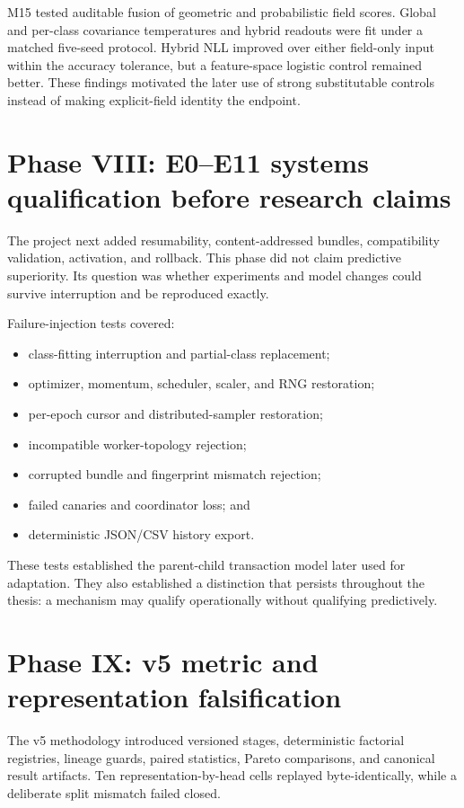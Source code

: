 \documentclass[12pt,oneside]{report}
\begin{document}
M15 tested auditable fusion of geometric and probabilistic field scores.
Global and per-class covariance temperatures and hybrid readouts were fit under
a matched five-seed protocol. Hybrid NLL improved over either field-only input
within the accuracy tolerance, but a feature-space logistic control remained
better. These findings motivated the later use of strong substitutable controls
instead of making explicit-field identity the endpoint.

\section{Phase VIII: E0--E11 systems qualification before research claims}

The project next added resumability, content-addressed bundles, compatibility
validation, activation, and rollback. This phase did not claim predictive
superiority. Its question was whether experiments and model changes could
survive interruption and be reproduced exactly.

Failure-injection tests covered:

\begin{itemize}
\item class-fitting interruption and partial-class replacement;
\item optimizer, momentum, scheduler, scaler, and RNG restoration;
\item per-epoch cursor and distributed-sampler restoration;
\item incompatible worker-topology rejection;
\item corrupted bundle and fingerprint mismatch rejection;
\item failed canaries and coordinator loss; and
\item deterministic JSON/CSV history export.
\end{itemize}

These tests established the parent-child transaction model later used for
adaptation. They also established a distinction that persists throughout the
thesis: a mechanism may qualify operationally without qualifying
predictively.

\section{Phase IX: v5 metric and representation falsification}

The v5 methodology introduced versioned stages, deterministic factorial
registries, lineage guards, paired statistics, Pareto comparisons, and
canonical result artifacts. Ten representation-by-head cells replayed
byte-identically, while a deliberate split mismatch failed closed.
\end{document}
